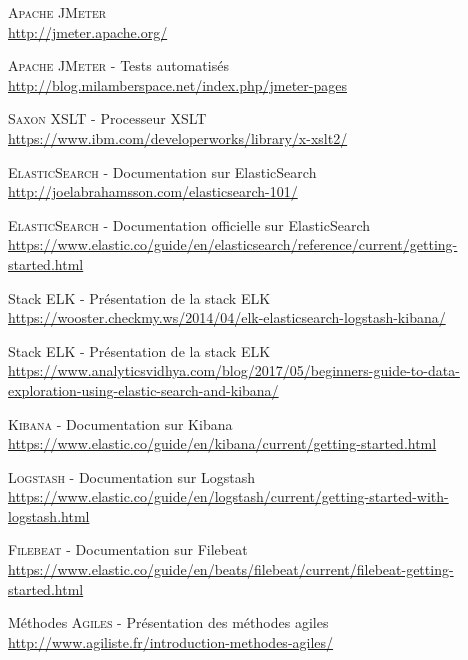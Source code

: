 \documentclass[11pt,twoside]{scrreprt}
\begin{document}
\begin{thebibliography}{9}
		\textsc{Apache JMeter} \\
		\url{http://jmeter.apache.org/}
				
		\textsc{Apache JMeter - }\textsf{Tests automatisés} \\
		\url{http://blog.milamberspace.net/index.php/jmeter-pages}
		
		\textsc{Saxon XSLT - }\textsf{Processeur XSLT} \\
		\url{https://www.ibm.com/developerworks/library/x-xslt2/}
		
		\textsc{ElasticSearch - }\textsf{Documentation sur ElasticSearch} \\
		\url{http://joelabrahamsson.com/elasticsearch-101/}
		
		\textsc{ElasticSearch - }\textsf{Documentation officielle sur ElasticSearch} \\
		\url{https://www.elastic.co/guide/en/elasticsearch/reference/current/getting-started.html}
		
		Stack \textsc{ELK - }\textsf{Présentation de la stack ELK} \\
		\url{https://wooster.checkmy.ws/2014/04/elk-elasticsearch-logstash-kibana/}
		
		Stack \textsc{ELK - }\textsf{Présentation de la stack ELK} \\
		\url{https://www.analyticsvidhya.com/blog/2017/05/beginners-guide-to-data-exploration-using-elastic-search-and-kibana/}
		
		\textsc{Kibana - }\textsf{Documentation sur Kibana} \\
		\url{https://www.elastic.co/guide/en/kibana/current/getting-started.html}
		
		\textsc{Logstash - }\textsf{Documentation sur Logstash} \\
		\url{https://www.elastic.co/guide/en/logstash/current/getting-started-with-logstash.html}
		
		\textsc{Filebeat - }\textsf{Documentation sur Filebeat} \\
		\url{https://www.elastic.co/guide/en/beats/filebeat/current/filebeat-getting-started.html}
		
		Méthodes \textsc{Agiles - }\textsf{Présentation des méthodes agiles} \\
		\url{http://www.agiliste.fr/introduction-methodes-agiles/}
		

\end{thebibliography}
\end{document}
